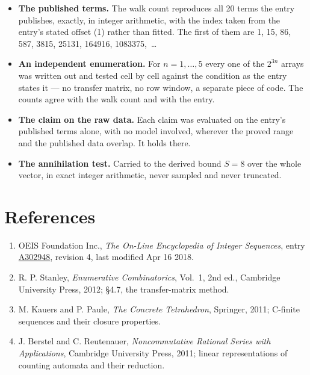 \documentclass[11pt]{article}
\theoremstyle{definition}
\begin{document}
\begin{itemize}

\item {\bfseries The published terms.} The walk count reproduces all 20 terms the entry publishes, exactly, in integer arithmetic, with the index taken from the entry's stated offset (1) rather than fitted. The first of them are 1, 15, 86, 587, 3815, 25131, 164916, 1083375,~\dots

\item {\bfseries An independent enumeration.} For $n = 1,\dots,5$ every one of the $2^{3n}$ arrays was written out and tested cell by cell against the condition as the entry states it --- no transfer matrix, no row window, a separate piece of code. The counts agree with the walk count and with the entry.

\item {\bfseries The claim on the raw data.} Each claim was evaluated on the entry's published terms alone, with no model involved, wherever the proved range and the published data overlap. It holds there.

\item {\bfseries The annihilation test.} Carried to the derived bound $S = 8$ over the whole vector, in exact integer arithmetic, never sampled and never truncated.

\end{itemize}

\section{References}

\begin{enumerate}

\item OEIS Foundation Inc., \emph{The On-Line Encyclopedia of Integer Sequences}, entry \href{https://oeis.org/A302948}{A302948}, revision 4, last modified Apr 16 2018.

\item R. P. Stanley, \emph{Enumerative Combinatorics}, Vol.~1, 2nd ed., Cambridge University Press, 2012; \S4.7, the transfer-matrix method.

\item M. Kauers and P. Paule, \emph{The Concrete Tetrahedron}, Springer, 2011; C-finite sequences and their closure properties.

\item J. Berstel and C. Reutenauer, \emph{Noncommutative Rational Series with Applications}, Cambridge University Press, 2011; linear representations of counting automata and their reduction.

\end{enumerate}
\end{document}
